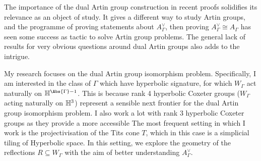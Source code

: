 The importance of the dual Artin group construction in recent proofs solidifies its relevance as an object of study.
It gives a different way to study Artin groups, and the programme of proving statements about $A^\vee_\Gamma$, then proving  $A^\vee_\Gamma \cong A_\Gamma$ has seen some success as tactic to solve Artin group problems.
The general lack of results for very obvious questions around dual Artin groups also adds to the intrigue.

My research focuses on the dual Artin group isomorphism problem.
Specifically, I am interested in the class of $\Gamma$ which have hyperbolic signature, for which  $W_\Gamma$ act naturally on  $\Hbb^{\Abs{\Gamma}-1}$.
This is because rank 4  hyperbolic Coxeter groups ($W_\Gamma$ acting naturally on $\mathbb{H}^3$) represent a sensible next frontier for the dual Artin group isomorphism problem.
I also work a lot with rank 3 hyperbolic Coxeter groups as they provide a more accessible
The most frequent setting in which I work is the projectivisation of the Tits cone $T$, which in this case is a simplicial tiling of Hyperbolic space.
In this setting, we explore the geometry of the reflections $R \subseteq W_\Gamma$ with the aim of better understanding  $A^\vee_\Gamma$.
